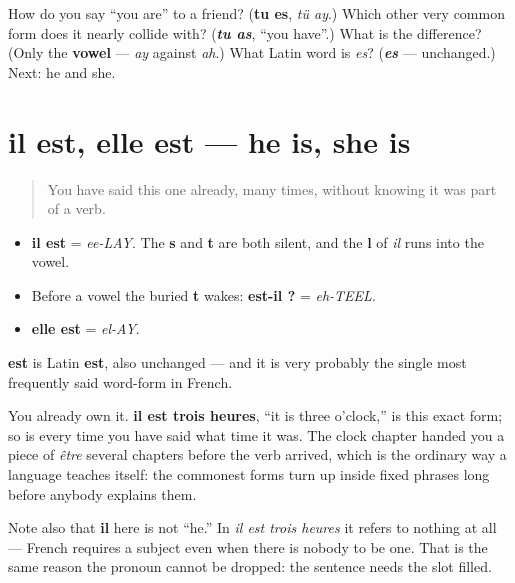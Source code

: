 \begin{tcolorbox}[breakable,colback=teal!4,colframe=teal!35!black,title={Before you move on}]
How do you say \textquotedblleft{}you are\textquotedblright{} to a friend? (\textbf{tu es}, \emph{tü ay}.) Which other very common form does it nearly collide with? (\emph{\textbf{tu as}}, \textquotedblleft{}you have\textquotedblright{}.) What is the difference? (Only the \textbf{vowel} — \emph{ay} against \emph{ah}.) What Latin word is \emph{es}? (\emph{\textbf{es}} — unchanged.) Next: he and she.
\end{tcolorbox}
\section[il est, elle est]{il est, elle est — he is, she is}

\label{lesson:FR-C16-est}



\begin{quote}
You have said this one already, many times, without knowing it was part of a verb.
\end{quote}

\begin{sounds}
\begin{itemize}
\raggedright
  \item \textbf{il est} = \emph{ee-LAY}. The \textbf{s} and \textbf{t} are both silent, and the \textbf{l} of \emph{il} runs into the vowel.
  \item Before a vowel the buried \textbf{t} wakes: \textbf{est-il ?} = \emph{eh-TEEL}.
  \item \textbf{elle est} = \emph{el-AY}.
\end{itemize}
\end{sounds}

\begin{cousinweb}
\textbf{est} is Latin \textbf{est}, also unchanged — and it is very probably the single most frequently said word-form in French.

You already own it. \textbf{il est trois heures}, \textquotedblleft{}it is three o'clock,\textquotedblright{} is this exact form; so is every time you have said what time it was. The clock chapter handed you a piece of \emph{être} several chapters before the verb arrived, which is the ordinary way a language teaches itself: the commonest forms turn up inside fixed phrases long before anybody explains them.

Note also that \textbf{il} here is not \textquotedblleft{}he.\textquotedblright{} In \emph{il est trois heures} it refers to nothing at all — French requires a subject even when there is nobody to be one. That is the same reason the pronoun cannot be dropped: the sentence needs the slot filled.
\end{cousinweb}

